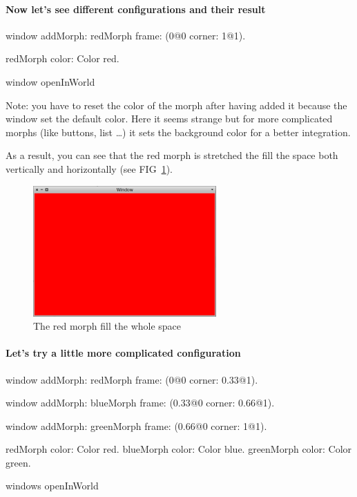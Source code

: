 \documentclass[a4paper,10pt,twoside]{book}
\begin{document}
\paragraph{Now let's see different configurations and their result}

\begin{code}{}
window
	addMorph: redMorph
	frame: (0@0 corner: 1@1).
	
redMorph color: Color red.	
	
window openInWorld
\end{code}
Note: you have to reset the color of the morph after having added it because the window set the default color. Here it seems strange but for more complicated morphs (like buttons, list \dots) it sets the background color for a better integration.

As a result, you can see that the red morph is stretched the fill the space both vertically and horizontally (see FIG~\ref{fig:simpleLayoutExample1}).

\begin{figure}[ht]\centering
	\includegraphics[width=7cm]{SimpleLayoutExample1}
	\caption{The red morph fill the whole space}
	\label{fig:simpleLayoutExample1}
\end{figure}

\paragraph{Let's try a little more complicated configuration}

\begin{code}{}
window
	addMorph: redMorph
	frame: (0@0 corner: 0.33@1).

window
	addMorph: blueMorph
	frame: (0.33@0 corner: 0.66@1).

window
	addMorph: greenMorph
	frame: (0.66@0 corner: 1@1).

redMorph color: Color red.
blueMorph color: Color blue.
greenMorph color: Color green.

windows openInWorld
\end{code}
\end{document}
